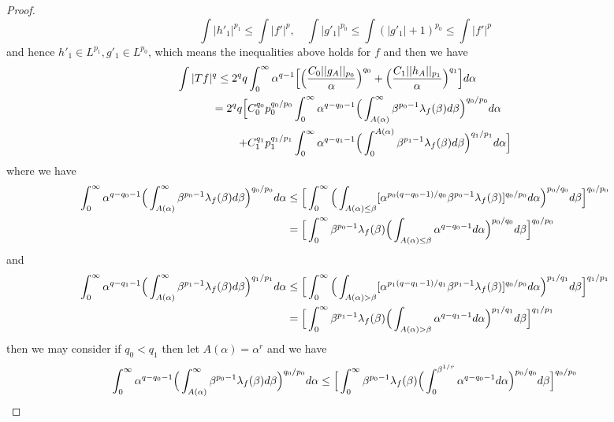 \begin{proof}
    \[
        \int |h'_1|^{p_1} \leq \int |f'|^{p}, \quad \int |g'_1|^{p_0} \leq \int (|g'_1|+1)^{p_0} \leq \int |f'| ^p
    \]
    and hence $h'_1 \in L^{p_1}, g'_1 \in L^{p_0}$, which means the inequalities above holds for $f$ and then we have
    \[
    \begin{aligned}
    \int |Tf|^q \leq 2^qq &\int_0^{\infty}\alpha^{q-1}\Big[\Big(\dfrac{C_0||g_A||_{p_0}}{\alpha}\Big)^{q_0}+\Big(\dfrac{C_1||h_A||_{p_1}}{\alpha}\Big)^{q_1}\Big]d\alpha \\
    = 2^qq\Big[ &C_0^{q_0}p_0^{q_0/p_0}\int_0^{\infty}\alpha^{q-q_0-1}\Big(\int_{A(\alpha)}^{\infty}\beta^{p_0-1}\lambda_{f}(\beta)d\beta\Big)^{q_0/p_0}d\alpha\\ +&C_1^{q_1}p_1^{q_1/p_1}\int_0^{\infty}\alpha^{q-q_1-1}\Big(\int_0^{A(\alpha)}\beta^{p_1-1}\lambda_{f}(\beta)d\beta\Big)^{q_1/p_1}d\alpha\Big]
    \end{aligned}
    \]
    where we have
    \[
    \begin{aligned}
    \int_0^{\infty}\alpha^{q-q_0-1}\Big(\int_{A(\alpha)}^{\infty}\beta^{p_0-1}\lambda_{f}(\beta)d\beta\Big)^{q_0/p_0}d\alpha &\leq \Big[\int_0^{\infty}\Big(\int_{A(\alpha) \leq \beta} [\alpha^{p_0(q-q_0-1)/q_0}\beta^{p_0-1}\lambda_{f}(\beta)]^{q_0/p_0}d\alpha\Big)^{p_0/q_0}d\beta\Big]^{q_0/p_0} \\
    &=\Big[\int_0^{\infty}\beta^{p_0-1}\lambda_{f}(\beta)\Big(\int_{A(\alpha) \leq \beta} \alpha^{q-q_0-1}d\alpha\Big)^{p_0/q_0}d\beta\Big]^{q_0/p_0}
    \end{aligned}
    \]
    and
    \[
    \begin{aligned}
    \int_0^{\infty}\alpha^{q-q_1-1}\Big(\int_{A(\alpha)}^{\infty}\beta^{p_1-1}\lambda_{f}(\beta)d\beta\Big)^{q_1/p_1}d\alpha &\leq \Big[\int_0^{\infty}\Big(\int_{A(\alpha) > \beta} [\alpha^{p_1(q-q_1-1)/q_1}\beta^{p_1-1}\lambda_{f}(\beta)]^{q_0/p_0}d\alpha\Big)^{p_1/q_1}d\beta\Big]^{q_1/p_1} \\
    &=\Big[\int_0^{\infty}\beta^{p_1-1}\lambda_{f}(\beta)\Big(\int_{A(\alpha) > \beta} \alpha^{q-q_1-1}d\alpha\Big)^{p_1/q_1}d\beta\Big]^{q_1/p_1}
    \end{aligned}
    \]
    then we may consider if $q_0<q_1$ then let $A(\alpha) = \alpha^{r}$ and we have
    \[
    \begin{aligned}
    \int_0^{\infty}\alpha^{q-q_0-1}\Big(\int_{A(\alpha)}^{\infty}\beta^{p_0-1}\dstrb{f}(\beta)d\beta\Big)^{q_0/p_0}d\alpha &\leq \Big[\int_0^{\infty}\beta^{p_0-1}\dstrb{f}(\beta)\Big(\int_0^{\beta^{1/r}} \alpha^{q-q_0-1}d\alpha\Big)^{p_0/q_0}d\beta\Big]^{q_0/p_0} \\

\end{aligned}\]
\end{proof}
